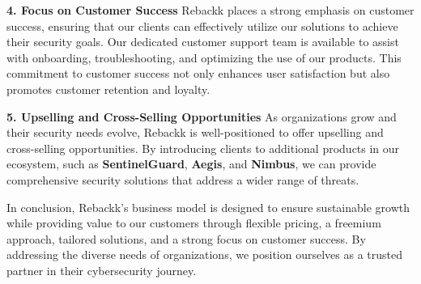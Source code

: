 \textbf{4. Focus on Customer Success}  
Rebackk places a strong emphasis on customer success, ensuring that our clients can effectively utilize our solutions to achieve their security goals. Our dedicated customer support team is available to assist with onboarding, troubleshooting, and optimizing the use of our products. This commitment to customer success not only enhances user satisfaction but also promotes customer retention and loyalty.

\textbf{5. Upselling and Cross-Selling Opportunities}  
As organizations grow and their security needs evolve, Rebackk is well-positioned to offer upselling and cross-selling opportunities. By introducing clients to additional products in our ecosystem, such as \textbf{SentinelGuard}, \textbf{Aegis}, and \textbf{Nimbus}, we can provide comprehensive security solutions that address a wider range of threats.

In conclusion, Rebackk's business model is designed to ensure sustainable growth while providing value to our customers through flexible pricing, a freemium approach, tailored solutions, and a strong focus on customer success. By addressing the diverse needs of organizations, we position ourselves as a trusted partner in their cybersecurity journey.
